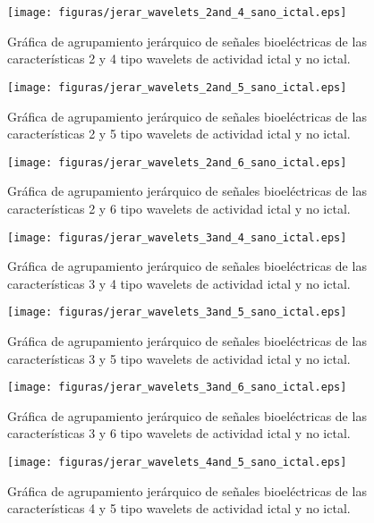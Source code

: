 \begin{figure}[H]
    \centering
    \texttt{[image: figuras/jerar\_wavelets\_2and\_4\_sano\_ictal.eps]}
    \caption{Gráfica de agrupamiento jerárquico de señales bioeléctricas de las características 2 y 4 tipo wavelets de actividad ictal y no ictal.}
    \label{fig: jerar_wave_2_4}
\end{figure}
\begin{figure}[H]
    \centering
    \texttt{[image: figuras/jerar\_wavelets\_2and\_5\_sano\_ictal.eps]}
    \caption{Gráfica de agrupamiento jerárquico de señales bioeléctricas de las características 2 y 5 tipo wavelets de actividad ictal y no ictal.}
    \label{fig: jerar_wave_2_5}
\end{figure}

\begin{figure}[H]
    \centering
    \texttt{[image: figuras/jerar\_wavelets\_2and\_6\_sano\_ictal.eps]}
    \caption{Gráfica de agrupamiento jerárquico de señales bioeléctricas de las características 2 y 6 tipo wavelets de actividad ictal y no ictal.}
    \label{fig: jerar_wave_2_6}
\end{figure}
\begin{figure}[H]
    \centering
    \texttt{[image: figuras/jerar\_wavelets\_3and\_4\_sano\_ictal.eps]}
    \caption{Gráfica de agrupamiento jerárquico de señales bioeléctricas de las características 3 y 4 tipo wavelets de actividad ictal y no ictal.}
    \label{fig: jerar_wave_3_4}
\end{figure}
\begin{figure}[H]
    \centering
    \texttt{[image: figuras/jerar\_wavelets\_3and\_5\_sano\_ictal.eps]}
    \caption{Gráfica de agrupamiento jerárquico de señales bioeléctricas de las características 3 y 5 tipo wavelets de actividad ictal y no ictal.}
    \label{fig: jerar_wave_3_5}
\end{figure}
\begin{figure}[H]
    \centering
    \texttt{[image: figuras/jerar\_wavelets\_3and\_6\_sano\_ictal.eps]}
    \caption{Gráfica de agrupamiento jerárquico de señales bioeléctricas de las características 3 y 6 tipo wavelets de actividad ictal y no ictal.}
    \label{fig: jerar_wave_3_6}
\end{figure}
\begin{figure}[H]
    \centering
    \texttt{[image: figuras/jerar\_wavelets\_4and\_5\_sano\_ictal.eps]}
    \caption{Gráfica de agrupamiento jerárquico de señales bioeléctricas de las características 4 y 5 tipo wavelets de actividad ictal y no ictal.}
    \label{fig: jerar_wave_4_5}
\end{figure}
